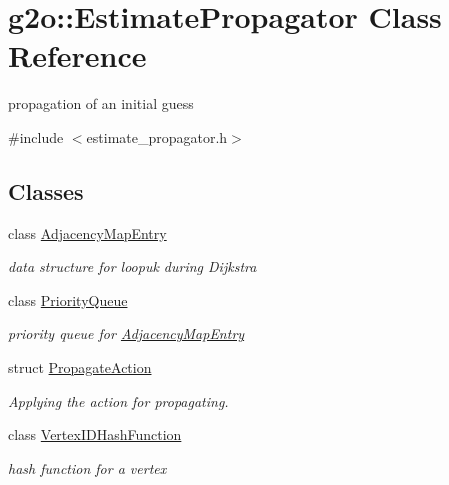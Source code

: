 \hypertarget{classg2o_1_1_estimate_propagator}{}\section{g2o\+:\+:Estimate\+Propagator Class Reference}
\label{classg2o_1_1_estimate_propagator}


propagation of an initial guess  




{\ttfamily \#include $<$estimate\+\_\+propagator.\+h$>$}

\subsection*{Classes}
\begin{DoxyCompactItemize}
\item 
class \mbox{\hyperlink{classg2o_1_1_estimate_propagator_1_1_adjacency_map_entry}{Adjacency\+Map\+Entry}}
\begin{DoxyCompactList}\small\item\em data structure for loopuk during Dijkstra \end{DoxyCompactList}\item 
class \mbox{\hyperlink{classg2o_1_1_estimate_propagator_1_1_priority_queue}{Priority\+Queue}}
\begin{DoxyCompactList}\small\item\em priority queue for \mbox{\hyperlink{classg2o_1_1_estimate_propagator_1_1_adjacency_map_entry}{Adjacency\+Map\+Entry}} \end{DoxyCompactList}\item 
struct \mbox{\hyperlink{structg2o_1_1_estimate_propagator_1_1_propagate_action}{Propagate\+Action}}
\begin{DoxyCompactList}\small\item\em Applying the action for propagating. \end{DoxyCompactList}\item 
class \mbox{\hyperlink{classg2o_1_1_estimate_propagator_1_1_vertex_i_d_hash_function}{Vertex\+I\+D\+Hash\+Function}}
\begin{DoxyCompactList}\small\item\em hash function for a vertex \end{DoxyCompactList}\end{DoxyCompactItemize}
